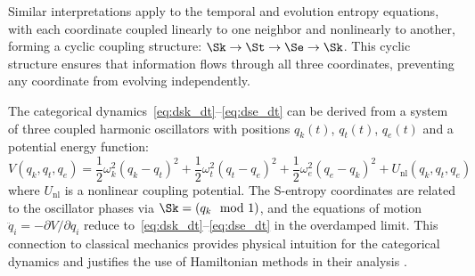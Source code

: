 Similar interpretations apply to the temporal and evolution entropy equations, with each coordinate coupled linearly to one neighbor and nonlinearly to another, forming a cyclic coupling structure: $\Sk \to \St \to \Se \to \Sk$. This cyclic structure ensures that information flows through all three coordinates, preventing any coordinate from evolving independently.

\begin{remark}
\label{rem:oscillator_derivation}
The categorical dynamics~\eqref{eq:dsk_dt}--\eqref{eq:dse_dt} can be derived from a system of three coupled harmonic oscillators with positions $q_k(t)$, $q_t(t)$, $q_e(t)$ and a potential energy function:
\begin{equation}
V(q_k, q_t, q_e) = \frac{1}{2}\omega_k^2 (q_k - q_t)^2 + \frac{1}{2}\omega_t^2 (q_t - q_e)^2 + \frac{1}{2}\omega_e^2 (q_e - q_k)^2 + U_{\text{nl}}(q_k, q_t, q_e)
\label{eq:oscillator_potential}
\end{equation}
where $U_{\text{nl}}$ is a nonlinear coupling potential. The S-entropy coordinates are related to the oscillator phases via $\Sk = (q_k \mod 1)$, and the equations of motion $\ddot{q}_i = -\partial V/\partial q_i$ reduce to~\eqref{eq:dsk_dt}--\eqref{eq:dse_dt} in the overdamped limit. This connection to classical mechanics provides physical intuition for the categorical dynamics and justifies the use of Hamiltonian methods in their analysis \citep{goldstein2002classical}.
\end{remark}

